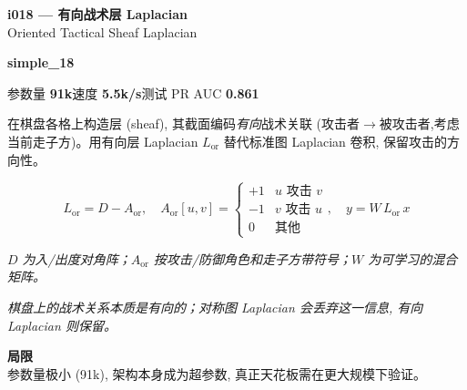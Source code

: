 \documentclass[10pt,a4paper]{article}
\newcommand{\pillsi}[0]{\colorbox{s18redbg}{\strut\textcolor{s18red}{\scriptsize\bfseries\sffamily simple\_18}}}
\begin{document}
\begin{tcolorbox}
\begin{tcolorbox}[archhead, boxsep=0pt, top=4pt, bottom=4pt]
\textcolor{deepforest}{\sffamily\bfseries\large i018 --- 有向战术层 Laplacian} \\[2pt]
{\color{muted}\small Oriented Tactical Sheaf Laplacian}
\\[1pt]\textcolor{muted}{\sffamily\scriptsize \pillsi{}\quad 参数量 \textbf{91k}\quad 速度 \textbf{5.5k/s}\quad 测试 PR AUC \textbf{0.861}}
\end{tcolorbox}
\smallskip
在棋盘各格上构造层 (sheaf), 其截面编码\emph{有向}战术关联 (攻击者$\to$被攻击者,考虑当前走子方)。用有向层 Laplacian $L_{\mathrm{or}}$ 替代标准图 Laplacian 卷积, 保留攻击的方向性。
\par\smallskip
\begin{equation*}
L_{\mathrm{or}} = D - A_{\mathrm{or}}, \quad A_{\mathrm{or}}[u,v] = \begin{cases}+1 & u\text{ 攻击 } v \\ -1 & v\text{ 攻击 } u \\ 0 & \text{其他}\end{cases}, \quad y = W\,L_{\mathrm{or}}\,x
\end{equation*}
\par\vspace{-4pt}\begin{center}\textit{\textcolor{muted}{\small $D$ 为入/出度对角阵；$A_{\mathrm{or}}$ 按攻击/防御角色和走子方带符号；$W$ 为可学习的混合矩阵。}}\end{center}
\par\smallskip{\color{forest}\sffamily\bfseries\textgreater\,}\textit{棋盘上的战术关系本质是有向的；对称图 Laplacian 会丢弃这一信息, 有向 Laplacian 则保留。}
\par\smallskip\textbf{\sffamily\footnotesize\color{muted}局限}\\
参数量极小 (91k), 架构本身成为超参数, 真正天花板需在更大规模下验证。
\end{tcolorbox}
\end{document}

